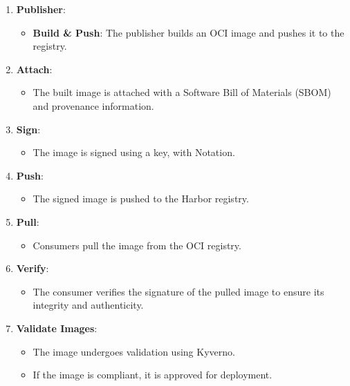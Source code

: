 \documentclass[a4paper]{spie}  %
\begin{document}
\begin{enumerate}
    \item \textbf{Publisher}:
    \begin{itemize}
        \item \textbf{Build \& Push}: The publisher builds an OCI image and pushes it to the registry.
    \end{itemize}
    
    \item \textbf{Attach}:
    \begin{itemize}
        \item The built image is attached with a Software Bill of Materials (SBOM) and provenance information.
    \end{itemize}
    
    \item \textbf{Sign}:
    \begin{itemize}
        \item The image is signed using a key, with Notation.
    \end{itemize}
    
    \item \textbf{Push}:
    \begin{itemize}
        \item The signed image is pushed to the Harbor registry.
    \end{itemize}
    
    \item \textbf{Pull}:
    \begin{itemize}
        \item Consumers pull the image from the OCI registry.
    \end{itemize}
    
    \item \textbf{Verify}:
    \begin{itemize}
        \item The consumer verifies the signature of the pulled image to ensure its integrity and authenticity.
    \end{itemize}
    
    \item \textbf{Validate Images}:
    \begin{itemize}
        \item The image undergoes validation using Kyverno.
        \item If the image is compliant, it is approved for deployment.
    \end{itemize}
    

\end{enumerate}
\end{document}
